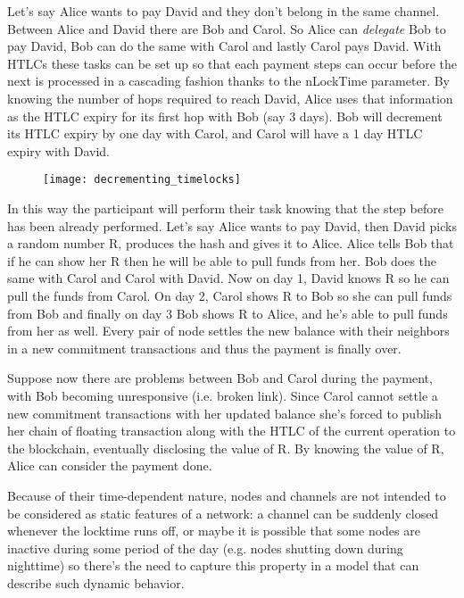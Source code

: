 		Let's say Alice wants to pay David and they don't belong in the same channel. Between Alice and David there are Bob and Carol. So Alice can \textit{delegate} Bob to pay David, Bob can do the same with Carol and lastly Carol pays David. With HTLCs these tasks can be set up so that each payment steps can occur before the next is processed in a cascading fashion thanks to the nLockTime parameter. By knowing the number of hops required to reach David, Alice uses that information as the HTLC expiry for its first hop with Bob (say 3 days). Bob will decrement its HTLC expiry by one day with Carol, and Carol will have a 1 day HTLC expiry with David. 
		
		\begin{figure}[h]
			\centering
			\texttt{[image: decrementing\_timelocks]}
		\end{figure}
	
		In this way the participant will perform their task knowing that the step before has been already performed. Let's say Alice wants to pay David, then David picks a random number R, produces the hash and gives it to Alice. Alice tells Bob that if he can show her R then he will be able to pull funds from her. Bob does the same with Carol and Carol with David. Now on day 1, David knows R so he can pull the funds from Carol. On day 2, Carol shows R to Bob so she can pull funds from Bob and finally on day 3 Bob shows R to Alice, and he's able to pull funds from her as well. Every pair of node settles the new balance with their neighbors in a new commitment transactions and thus the payment is finally over.
		
		Suppose now there are problems between Bob and Carol during the payment, with Bob becoming unresponsive (i.e. broken link). Since Carol cannot settle a new commitment transactions with her updated balance she's forced to publish her chain of floating transaction along with the HTLC of the current operation to the blockchain, eventually disclosing the value of R. By knowing the value of R, Alice can consider the payment done.
		
		Because of their time-dependent nature, nodes and channels are not intended to be considered as static features of a network: a channel can be suddenly closed whenever the locktime runs off, or maybe it is possible that some nodes are inactive during some period of the day (e.g. nodes shutting down during nighttime) so there's the need to capture this property in a model that can describe such dynamic behavior.
		
	